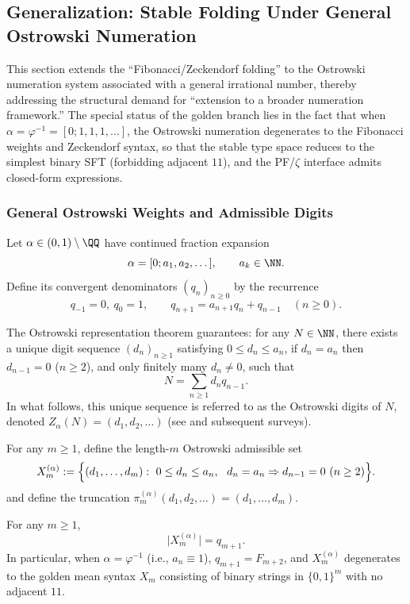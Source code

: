 \subsection{Generalization: Stable Folding Under General Ostrowski Numeration}\label{subsec:ostrowski-generalized-fold}

This section extends the ``Fibonacci/Zeckendorf folding'' to the Ostrowski numeration system associated with a general irrational number, thereby addressing the structural demand for ``extension to a broader numeration framework.'' The special status of the golden branch lies in the fact that when $\alpha=\varphi^{-1}=[0;1,1,1,\dots]$, the Ostrowski numeration degenerates to the Fibonacci weights and Zeckendorf syntax, so that the stable type space reduces to the simplest binary SFT (forbidding adjacent $11$), and the PF/$\zeta$ interface admits closed-form expressions.

\subsubsection{General Ostrowski Weights and Admissible Digits}

Let $\alpha\in(0,1)\setminus\QQ$ have continued fraction expansion
\[
\alpha=[0;a_1,a_2,\dots],\qquad a_k\in\NN.
\]
Define its convergent denominators $(q_n)_{n\ge 0}$ by the recurrence
\[
q_{-1}=0,\ q_0=1,\qquad q_{n+1}=a_{n+1}q_n+q_{n-1}\quad(n\ge 0).
\]

The Ostrowski representation theorem guarantees: for any $N\in\NN$, there exists a unique digit sequence $(d_n)_{n\ge 1}$ satisfying
$0\le d_n\le a_n$, if $d_n=a_n$ then $d_{n-1}=0$ ($n\ge 2$), and only finitely many $d_n\neq 0$, such that
\[
N=\sum_{n\ge 1} d_n q_{n-1}.
\]
In what follows, this unique sequence is referred to as the Ostrowski digits of $N$, denoted $Z_\alpha(N)=(d_1,d_2,\dots)$ (see \cite{Ostrowski1922} and subsequent surveys).

\begin{definition}\label{def:Xm-alpha}
For any $m\ge 1$, define the length-$m$ Ostrowski admissible set
\[
X_m^{(\alpha)}:=\Bigl\{(d_1,\dots,d_m):\ 0\le d_n\le a_n,\ \ d_n=a_n\Rightarrow d_{n-1}=0\ (n\ge 2)\Bigr\}.
\]
and define the truncation $\pi_m^{(\alpha)}(d_1,d_2,\dots)=(d_1,\dots,d_m)$.
\end{definition}

\begin{proposition}\label{prop:Xm-alpha-cardinality}
For any $m\ge 1$,
\[
\bigl|X_m^{(\alpha)}\bigr|=q_{m+1}.
\]
In particular, when $\alpha=\varphi^{-1}$ (i.e., $a_n\equiv 1$), $q_{m+1}=F_{m+2}$, and $X_m^{(\alpha)}$ degenerates to the golden mean syntax $X_m$ consisting of binary strings in $\{0,1\}^m$ with no adjacent $11$.
\end{proposition}

